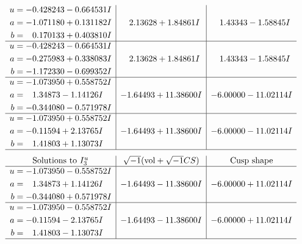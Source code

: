 \documentclass[1p]{elsarticle_modified}
\theoremstyle{definition}
\newcommand{\I}{\sqrt{-1}}
\begin{document}
$$\begin{array}{c|c|c}
\begin{aligned}
u &= -0.428243 - 0.664531 I \\
a &= -1.071180 + 0.131182 I \\
b &= \phantom{-}0.170133 + 0.403810 I\end{aligned}
 & \phantom{-}2.13628 + 1.84861 I & \phantom{-}1.43343 - 1.58845 I \\ \hline\begin{aligned}
u &= -0.428243 - 0.664531 I \\
a &= -0.275983 + 0.338083 I \\
b &= -1.172330 - 0.699352 I\end{aligned}
 & \phantom{-}2.13628 + 1.84861 I & \phantom{-}1.43343 - 1.58845 I \\ \hline\begin{aligned}
u &= -1.073950 + 0.558752 I \\
a &= \phantom{-}1.34873 - 1.14126 I \\
b &= -0.344080 - 0.571978 I\end{aligned}
 & -1.64493 + 11.38600 I & -6.00000 - 11.02114 I \\ \hline\begin{aligned}
u &= -1.073950 + 0.558752 I \\
a &= -0.11594 + 2.13765 I \\
b &= \phantom{-}1.41803 + 1.13073 I\end{aligned}
 & -1.64493 + 11.38600 I & -6.00000 - 11.02114 I\\
 \hline 
 \end{array}$$\newpage$$\begin{array}{c|c|c}  
\text{Solutions to }I^u_{3}& \I (\text{vol} + \sqrt{-1}CS) & \text{Cusp shape}\\
 \hline 
\begin{aligned}
u &= -1.073950 - 0.558752 I \\
a &= \phantom{-}1.34873 + 1.14126 I \\
b &= -0.344080 + 0.571978 I\end{aligned}
 & -1.64493 - 11.38600 I & -6.00000 + 11.02114 I \\ \hline\begin{aligned}
u &= -1.073950 - 0.558752 I \\
a &= -0.11594 - 2.13765 I \\
b &= \phantom{-}1.41803 - 1.13073 I\end{aligned}
 & -1.64493 - 11.38600 I & -6.00000 + 11.02114 I\\
 \hline 
 \end{array}$$\newpage\newpage\renewcommand{\arraystretch}{1}
\end{document}
